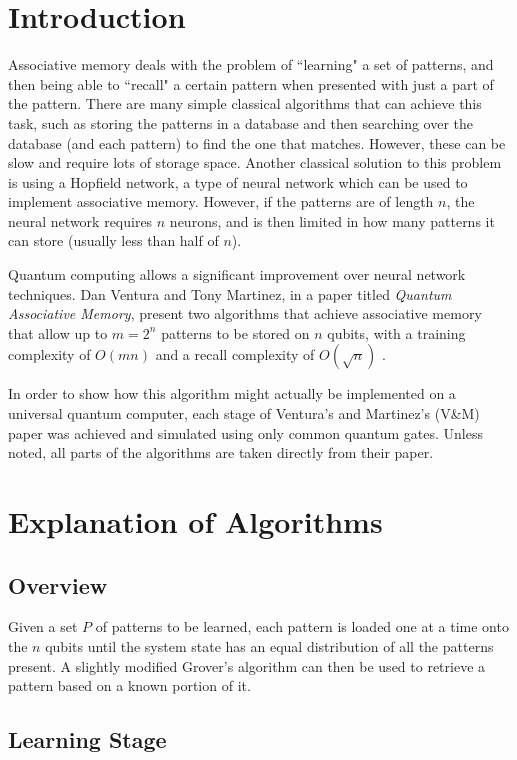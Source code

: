 \documentclass[11pt]{report}
\newcommand{\?}{\stackrel{?}{=}}
\begin{document}
\section{Introduction}

Associative memory deals with the problem of ``learning" a set of patterns, and then being able to ``recall" a certain pattern when presented with just a part of the pattern. There are many simple classical algorithms that can achieve this task, such as storing the patterns in a database and then searching over the database (and each pattern) to find the one that matches. However, these can be slow and require lots of storage space. Another classical solution to this problem is using a Hopfield network, a type of neural network which can be used to implement associative memory. However, if the patterns are of length $n$, the neural network requires $n$ neurons, and is then limited in how many patterns it can store (usually less than half of $n$).

Quantum computing allows a significant improvement over neural network techniques. Dan Ventura and Tony Martinez, in a paper titled \textit{Quantum Associative Memory}, present two algorithms that achieve associative memory that allow up to $m=2^n$ patterns to be stored on $n$ qubits, with a training complexity of $O(mn)$ and a recall complexity of $O(\sqrt{n})$ \cite{Ven00}.

In order to show how this algorithm might actually be implemented on a universal quantum computer, each stage of Ventura's and Martinez's (V\&M) paper was achieved and simulated using only common quantum gates. Unless noted, all parts of the algorithms are taken directly from their paper.

\section{Explanation of Algorithms}

\subsection{Overview}

Given a set $P$ of patterns to be learned, each pattern is loaded one at a time onto the $n$ qubits until the system state has an equal distribution of all the patterns present. A slightly modified Grover's algorithm can then be used to retrieve a pattern based on a known portion of it.

\subsection{Learning Stage}
\end{document}
